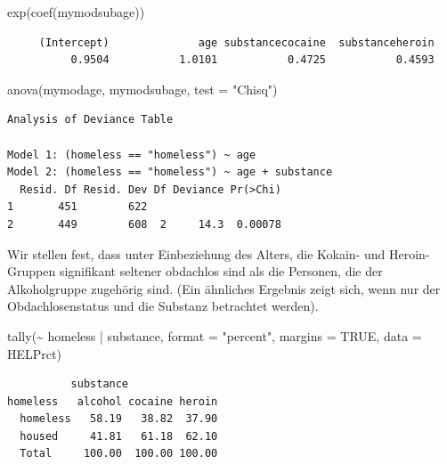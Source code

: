 \documentclass[
  ngerman,
]{scrbook}
\newenvironment{Shaded}{\begin{snugshade}}{\end{snugshade}}
\newcommand{\AttributeTok}[1]{\textcolor[rgb]{0.77,0.63,0.00}{#1}}
\newcommand{\ConstantTok}[1]{\textcolor[rgb]{0.00,0.00,0.00}{#1}}
\newcommand{\FunctionTok}[1]{\textcolor[rgb]{0.00,0.00,0.00}{#1}}
\newcommand{\NormalTok}[1]{#1}
\newcommand{\SpecialCharTok}[1]{\textcolor[rgb]{0.00,0.00,0.00}{#1}}
\newcommand{\StringTok}[1]{\textcolor[rgb]{0.31,0.60,0.02}{#1}}
\begin{document}
\begin{Shaded}
\begin{Highlighting}[]
\FunctionTok{exp}\NormalTok{(}\FunctionTok{coef}\NormalTok{(mymodsubage))}
\end{Highlighting}
\end{Shaded}

\begin{verbatim}
     (Intercept)              age substancecocaine  substanceheroin 
          0.9504           1.0101           0.4725           0.4593 
\end{verbatim}

\begin{Shaded}
\begin{Highlighting}[]
\FunctionTok{anova}\NormalTok{(mymodage, mymodsubage, }\AttributeTok{test =} \StringTok{"Chisq"}\NormalTok{)}
\end{Highlighting}
\end{Shaded}

\begin{verbatim}
Analysis of Deviance Table

Model 1: (homeless == "homeless") ~ age
Model 2: (homeless == "homeless") ~ age + substance
  Resid. Df Resid. Dev Df Deviance Pr(>Chi)
1       451        622                     
2       449        608  2     14.3  0.00078
\end{verbatim}

Wir stellen fest, dass unter Einbeziehung des Alters, die Kokain- und Heroin-Gruppen signifikant seltener obdachlos sind als die Personen, die der Alkoholgruppe zugehörig sind.
(Ein ähnliches Ergebnis zeigt sich, wenn nur der Obdachlosenstatus und die Substanz betrachtet werden).

\begin{Shaded}
\begin{Highlighting}[]
\FunctionTok{tally}\NormalTok{(}\SpecialCharTok{\textasciitilde{}}\NormalTok{ homeless }\SpecialCharTok{|}\NormalTok{ substance, }\AttributeTok{format =} \StringTok{"percent"}\NormalTok{, }
      \AttributeTok{margins =} \ConstantTok{TRUE}\NormalTok{, }\AttributeTok{data =}\NormalTok{ HELPrct)}
\end{Highlighting}
\end{Shaded}

\begin{verbatim}
          substance
homeless   alcohol cocaine heroin
  homeless   58.19   38.82  37.90
  housed     41.81   61.18  62.10
  Total     100.00  100.00 100.00
\end{verbatim}
\end{document}
